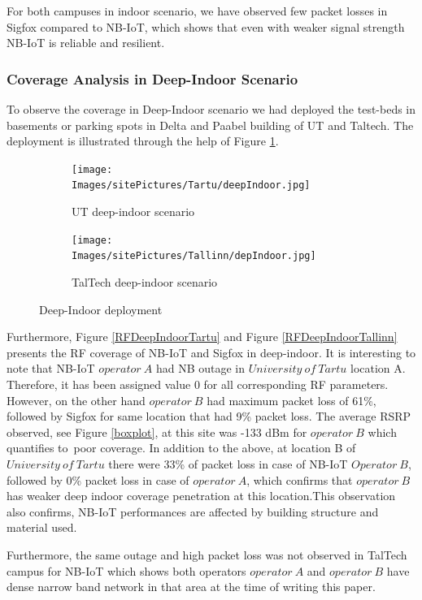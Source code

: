 \documentclass[12pt]{article}
\begin{document}
For both campuses in indoor scenario, we have observed few packet losses in Sigfox compared to NB-IoT, which shows that even with weaker signal strength NB-IoT is reliable and resilient.\par

\subsubsection{Coverage Analysis in Deep-Indoor Scenario}
To observe the coverage in Deep-Indoor scenario we had deployed the test-beds in basements or parking spots in Delta and Paabel building of UT and Taltech. The deployment is illustrated through the help of Figure \ref{fig:Deep-Indoor deployment}.

\begin{figure}[h!]
\centering
\begin{subfigure}[t]{0.42 \linewidth}
  \centering
  \texttt{[image: Images/sitePictures/Tartu/deepIndoor.jpg]}
  \caption{UT deep-indoor scenario}
  \end{subfigure}
  
  \begin{subfigure}[t]{0.42 \linewidth}
    \centering
    \texttt{[image: Images/sitePictures/Tallinn/depIndoor.jpg]}
    \caption{TalTech deep-indoor scenario}
  \end{subfigure}
   
    \caption{Deep-Indoor deployment}
    \label{fig:Deep-Indoor deployment}
\end{figure}

Furthermore, Figure \ref{RFDeepIndoorTartu} and Figure \ref{RFDeepIndoorTallinn} presents the RF coverage of NB-IoT and Sigfox in deep-indoor. It is interesting to note that NB-IoT $operator\ A$ had NB outage in $University\ of\ Tartu$ location A. Therefore, it has been assigned value 0 for all corresponding RF parameters. However, on the other hand $operator\ B$ had maximum packet loss of 61\%, followed by Sigfox for same location that had 9\% packet loss. The average RSRP observed, see Figure \ref{boxplot}, at this site was -133 dBm for $operator\ B$ which quantifies to\ poor coverage. In addition to the above, at location B of $University\ of\ Tartu$ there were 33\% of packet loss in case of NB-IoT $Operator\ B$, followed by 0\% packet loss in case of $operator\  A$, which confirms that $operator\ B$ has weaker deep indoor coverage penetration at this location.This observation also confirms, NB-IoT performances are affected by building structure and material used.\par
Furthermore, the same outage and high packet loss was not observed in TalTech campus for NB-IoT which shows both operators $operator\ A$ and $operator\ B$ have dense narrow band network in that area at the time of writing this paper.
\end{document}
